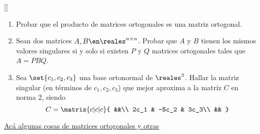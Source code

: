 \begin{enunciado}{\ejExtra} {\tiny[]}
  \begin{enumerate}[label=(\alph*)]
    \item Probar que el producto de matrices ortogonales es una matriz ortogonal.

    \item Sean dos matrices $A, B \en \reales^{n \times n}$. Probar que $A$ y $B$ tienen
          los mismos valores singulares si y solo si existen $P$ y $Q$ matrices ortogonales tales que $A = PBQ$.

    \item Sea $\set{c_1, c_2, c_3}$ una base ortonormal de $\reales^3$. Hallar la matriz singular (en términos de $c_1, c_2, c_3$)
          que mejor aproxima a la matriz $C$ en norma 2, siendo
          $$
            C =
            \matriz{c|c|c}{
              &&\\
              2c_1 & -5c_2 & 3c_3\\
              &&
            }
          $$
  \end{enumerate}
\end{enunciado}

\hyperlink{teoria-5:matrices}{Acá algunas cosas de matrices ortogonales y otras \click}

